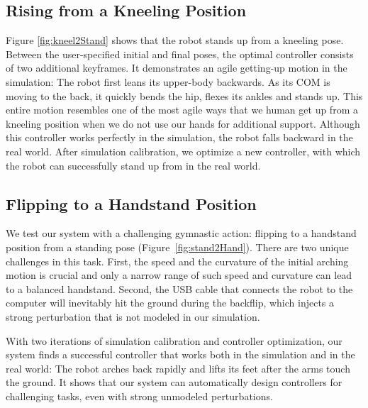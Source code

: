 \subsection{Rising from a Kneeling Position}

Figure \ref{fig:kneel2Stand} shows that the robot stands up from a kneeling pose. Between the user-specified initial and final poses, the optimal controller consists of two additional keyframes. It demonstrates an agile getting-up motion in the simulation: The robot first leans its upper-body backwards. As its COM is moving to the back, it quickly bends the hip, flexes its ankles and stands up. This entire motion resembles one of the most agile ways that we human get up from a kneeling position when we do not use our hands for additional support. Although this controller works perfectly in the simulation, the robot falls backward in the real world. After simulation calibration, we optimize a new controller, with which the robot can successfully stand up from in the real world.

\subsection{Flipping to a Handstand Position}
We test our system with a challenging gymnastic action: flipping to a handstand position from a standing pose (Figure~\ref{fig:stand2Hand}). There are two unique challenges in this task. First, the speed and the curvature of the initial arching motion is crucial and only a narrow range of such speed and curvature can lead to a balanced handstand. Second, the USB cable that connects the robot to the computer will inevitably hit the ground during the backflip, which injects a strong perturbation that is not modeled in our simulation.

With two iterations of simulation calibration and controller optimization, our system finds a successful controller that works both in the simulation and in the real world: The robot arches back rapidly and lifts its feet after the arms touch the ground. It shows that our system can automatically design controllers for challenging tasks, even with strong unmodeled perturbations.

